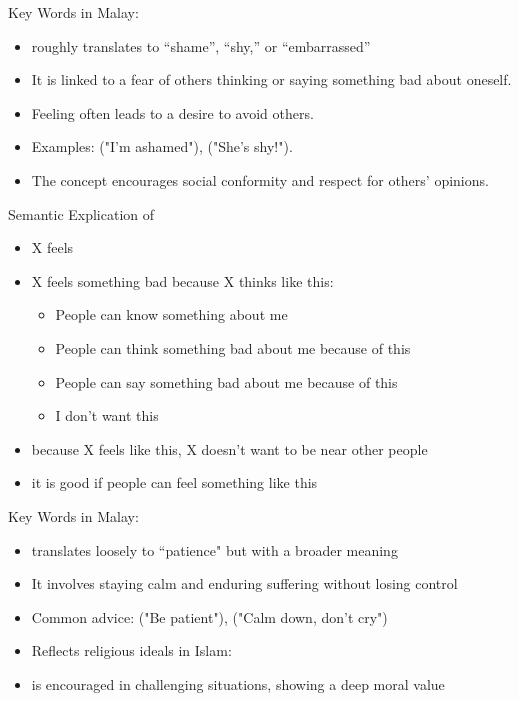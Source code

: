 \documentclass{beamer}
\newcommand{\ind}{\mtciteform}
\begin{document}
\begin{frame}{Key Words in Malay: }
    \begin{itemize}
        \item {} roughly translates to ``shame'', ``shy,'' or ``embarrassed''
        \item It is linked to a fear of others thinking or saying something bad about oneself.
        \item Feeling  often leads to a desire to avoid others.
        \item Examples:  ("I'm ashamed"),  ("She's shy!").
        \item The concept encourages social conformity and respect for others' opinions.
    \end{itemize}
\end{frame}

\begin{frame}{Semantic Explication of }
    \begin{itemize}
    \item X feels \ind{malu}
    \item X feels something bad because X thinks like this:
      \begin{itemize}
      \item People can know something about me
      \item People can think something bad about me because of this
      \item People can say something bad about me because of this
      \item I don't want this
      \end{itemize}
    \item because X feels like this, X doesn’t want to be near other people
    \item it is good if people can feel something like this
    \end{itemize}
\end{frame}

\begin{frame}{Key Words in Malay: }
    \begin{itemize}
        \item {} translates loosely to ``patience" but with a broader meaning
        \item It involves staying calm and enduring suffering without losing control
        \item Common advice:  ("Be patient"),  ("Calm down, don't cry")
        \item Reflects religious ideals in Islam: 
        \item {} is encouraged in challenging situations, showing a deep moral value
    \end{itemize}
\end{frame}
\end{document}
